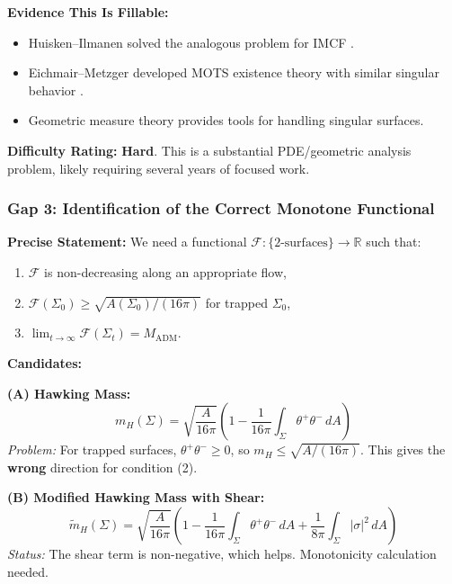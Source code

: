 \textbf{Evidence This Is Fillable:}
\begin{itemize}
    \item Huisken--Ilmanen solved the analogous problem for IMCF \cite{huisken2001}.
    \item Eichmair--Metzger developed MOTS existence theory with similar singular behavior \cite{eichmair2009}.
    \item Geometric measure theory provides tools for handling singular surfaces.
\end{itemize}

\textbf{Difficulty Rating:} \textbf{Hard}. This is a substantial PDE/geometric analysis problem, likely requiring several years of focused work.

\subsubsection{Gap 3: Identification of the Correct Monotone Functional}

\textbf{Precise Statement:} We need a functional $\mathcal{F}: \{\text{2-surfaces}\} \to \mathbb{R}$ such that:
\begin{enumerate}
    \item $\mathcal{F}$ is non-decreasing along an appropriate flow,
    \item $\mathcal{F}(\Sigma_0) \geq \sqrt{A(\Sigma_0)/(16\pi)}$ for trapped $\Sigma_0$,
    \item $\lim_{t\to\infty} \mathcal{F}(\Sigma_t) = M_{\mathrm{ADM}}$.
\end{enumerate}

\textbf{Candidates:}

\textbf{(A) Hawking Mass:}
\begin{equation}
    m_H(\Sigma) = \sqrt{\frac{A}{16\pi}}\left(1 - \frac{1}{16\pi}\int_\Sigma \theta^+\theta^- \, dA\right)
\end{equation}
\textit{Problem:} For trapped surfaces, $\theta^+\theta^- \geq 0$, so $m_H \leq \sqrt{A/(16\pi)}$. This gives the \textbf{wrong} direction for condition (2).

\textbf{(B) Modified Hawking Mass with Shear:}
\begin{equation}
    \tilde{m}_H(\Sigma) = \sqrt{\frac{A}{16\pi}}\left(1 - \frac{1}{16\pi}\int_\Sigma \theta^+\theta^- \, dA + \frac{1}{8\pi}\int_\Sigma |\sigma|^2 \, dA\right)
\end{equation}
\textit{Status:} The shear term is non-negative, which helps. Monotonicity calculation needed.

